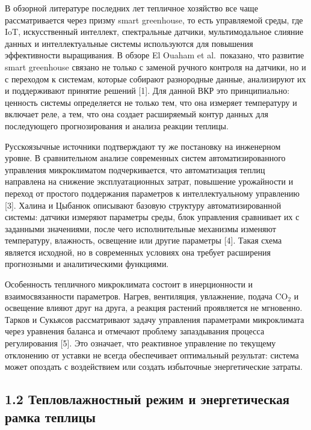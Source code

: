 \documentclass[a4paper,14pt]{extarticle}
\begin{document}
В обзорной литературе последних лет тепличное хозяйство все чаще
рассматривается через призму smart greenhouse, то есть управляемой
среды, где IoT, искусственный интеллект, спектральные датчики,
мультимодальное слияние данных и интеллектуальные системы используются
для повышения эффективности выращивания. В обзоре El Ouaham et
al.~показано, что развитие smart greenhouse связано не только с заменой
ручного контроля на датчики, но и с переходом к системам, которые
собирают разнородные данные, анализируют их и поддерживают принятие
решений {[}1{]}. Для данной ВКР это принципиально: ценность системы
определяется не только тем, что она измеряет температуру и включает
реле, а тем, что она создает расширяемый контур данных для последующего
прогнозирования и анализа реакции теплицы.

Русскоязычные источники подтверждают ту же постановку на инженерном
уровне. В сравнительном анализе современных систем автоматизированного
управления микроклиматом подчеркивается, что автоматизация теплиц
направлена на снижение эксплуатационных затрат, повышение урожайности и
переход от простого поддержания параметров к интеллектуальному
управлению {[}3{]}. Халина и Цыбанюк описывают базовую структуру
автоматизированной системы: датчики измеряют параметры среды, блок
управления сравнивает их с заданными значениями, после чего
исполнительные механизмы изменяют температуру, влажность, освещение или
другие параметры {[}4{]}. Такая схема является исходной, но в
современных условиях она требует расширения прогнозными и аналитическими
функциями.

Особенность тепличного микроклимата состоит в инерционности и
взаимосвязанности параметров. Нагрев, вентиляция, увлажнение, подача
CO\(_2\) и освещение влияют друг на друга, а реакция растений
проявляется не мгновенно. Тарков и Сукьясов рассматривают задачу
управления параметрами микроклимата через уравнения баланса и отмечают
проблему запаздывания процесса регулирования {[}5{]}. Это означает, что
реактивное управление по текущему отклонению от уставки не всегда
обеспечивает оптимальный результат: система может опоздать с
воздействием или создать избыточные энергетические затраты.

\subsection{1.2 Тепловлажностный режим и энергетическая рамка
теплицы}\label{ux442ux435ux43fux43bux43eux432ux43bux430ux436ux43dux43eux441ux442ux43dux44bux439-ux440ux435ux436ux438ux43c-ux438-ux44dux43dux435ux440ux433ux435ux442ux438ux447ux435ux441ux43aux430ux44f-ux440ux430ux43cux43aux430-ux442ux435ux43fux43bux438ux446ux44b}
\end{document}
